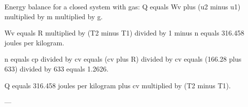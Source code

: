 Energy balance for a closed system with gas:  
Q equals Wv plus (u2 minus u1) multiplied by m multiplied by g.  

Wv equals R multiplied by (T2 minus T1) divided by 1 minus n equals 316.458 joules per kilogram.  

n equals cp divided by cv equals (cv plus R) divided by cv equals (166.28 plus 633) divided by 633 equals 1.2626.  

Q equals 316.458 joules per kilogram plus cv multiplied by (T2 minus T1).  

---